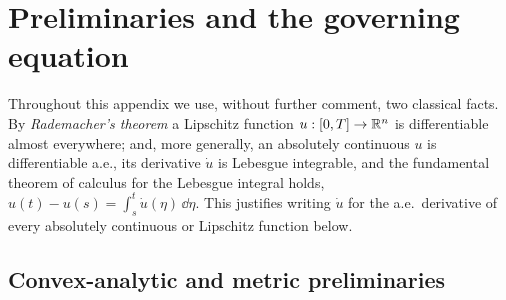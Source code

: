 %
%

\section{Preliminaries and the governing equation}
\label{app:framework}

Throughout this appendix we use, without further comment, two classical
facts. By \emph{Rademacher's theorem} a Lipschitz function
$u:[0,T]\to\mathbb{R}^n$ is differentiable almost everywhere; and, more
generally, an absolutely continuous $u$ is differentiable a.e., its
derivative $\dot u$ is Lebesgue integrable, and the fundamental theorem
of calculus for the Lebesgue integral holds,
$u(t)-u(s)=\int_s^t\dot u(\eta) \, \dd \eta$. This justifies writing $\dot u$ for the
a.e.\ derivative of every absolutely continuous or Lipschitz function
below.

\subsection{Convex-analytic and metric preliminaries}

